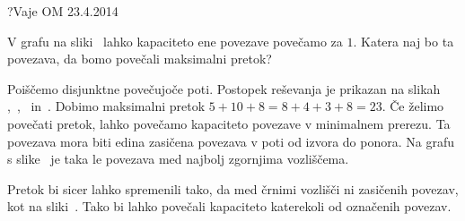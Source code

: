 \begin{naloga}{?}{Vaje OM 23.4.2014}
\begin{vprasanje}[pretok4]
V grafu na sliki~\fig{} lahko kapaciteto ene povezave povečamo za $1$.
Katera naj bo ta povezava, da bomo povečali maksimalni pretok?

\begin{slika}
\pgfslika
{}
\end{slika}
\end{vprasanje}

\begin{odgovor}
Poiščemo disjunktne povečujoče poti.
Postopek reševanja je prikazan na slikah~%
,~,~ in~.
Dobimo maksimalni pretok $5+10+8 = 8+4+3+8 = 23$.
Če želimo povečati pretok,
lahko povečamo kapaciteto povezave v minimalnem prerezu.
Ta povezava mora biti edina zasičena povezava v poti od izvora do ponora.
Na grafu s slike~
je taka le povezava med najbolj zgornjima vozliščema.

Pretok bi sicer lahko spremenili tako,
da med črnimi vozlišči ni zasičenih povezav, kot na sliki~.
Tako bi lahko povečali kapaciteto katerekoli od označenih povezav.

\begin{slika}
\pgfslika[pretok4a]
\end{slika}
\begin{slika}
\pgfslika[pretok4b]
\end{slika}
\begin{slika}
\pgfslika[pretok4c]
\end{slika}
\begin{slika}
\pgfslika[pretok4d]
\end{slika}
\begin{slika}
\pgfslika[pretok4e]
\end{slika}
\end{odgovor}
\end{naloga}


